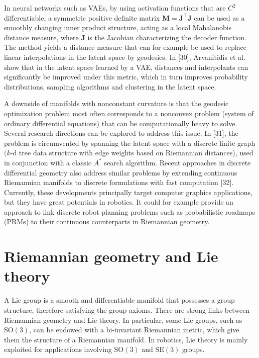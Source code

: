 \documentclass[10pt]{article}
\begin{document}
In neural networks such as VAEs, by using activation functions that are $C^{2}$ differentiable, a symmetric positive definite matrix $\boldsymbol{M}=\boldsymbol{J}^{\top} \boldsymbol{J}$ can be used as a smoothly changing inner product structure, acting as a local Mahalanobis distance measure, where $\boldsymbol{J}$ is the Jacobian characterizing the decoder function. The method yields a distance measure that can for example be used to replace linear interpolations in the latent space by geodesics. In [30], Arvanitidis et al. show that in the latent space learned by a VAE, distances and interpolants can significantly be improved under this metric, which in turn improves probability distributions, sampling algorithms and clustering in the latent space.

A downside of manifolds with nonconstant curvature is that the geodesic optimization problem most often corresponds to a nonconvex problem (system of ordinary differential equations) that can be computationally heavy to solve. Several research directions can be explored to address this issue. In [31], the problem is circumvented by spanning the latent space with a discrete finite graph $(k$-d tree data structure with edge weights based on Riemannian distances), used in conjunction with a classic $A^{*}$ search algorithm. Recent approaches in discrete differential geometry also address similar problems by extending continuous Riemannian manifolds to discrete formulations with fast computation [32]. Currently, these developments principally target computer graphics applications, but they have great potentials in robotics. It could for example provide an approach to link discrete robot planning problems such as probabilistic roadmaps (PRMs) to their continuous counterparts in Riemannian geometry.

\section{Riemannian geometry and Lie theory}
A Lie group is a smooth and differentiable manifold that possesses a group structure, therefore satisfying the group axioms. There are strong links between Riemannian geometry and Lie theory. In particular, some Lie groups, such as $\mathrm{SO}(3)$, can be endowed with a bi-invariant Riemannian metric, which give them the structure of a Riemannian manifold. In robotics, Lie theory is mainly exploited for applications involving $\mathrm{SO}(3)$ and $\mathrm{SE}(3)$ groups.
\end{document}
